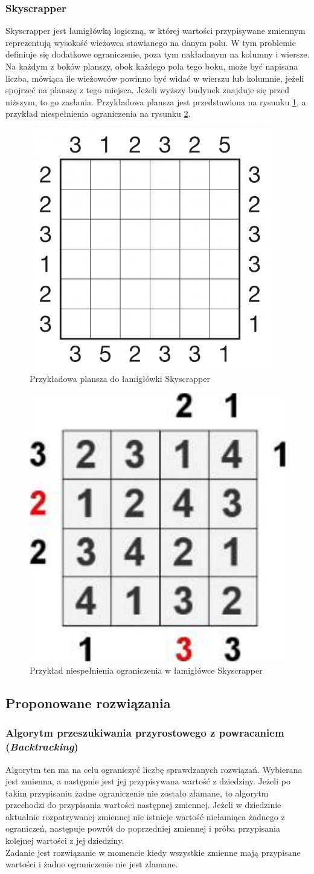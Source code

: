 \documentclass{article}
\begin{document}
	\subsubsection{Skyscrapper}
	Skyscrapper jest łamigłówką logiczną, w której wartości przypisywane zmiennym reprezentują wysokość wieżowca stawianego na danym polu. W tym problemie definiuje się dodatkowe ograniczenie, poza tym nakładanym na kolumny i wiersze. Na każdym z boków planszy, obok każdego pola tego boku, może być napisana liczba, mówiąca ile wieżowców powinno być widać w wierszu lub kolumnie, jeżeli spojrzeć na planszę z tego miejsca. Jeżeli wyższy budynek znajduje się przed niższym, to go zasłania. Przykładowa plansza jest przedstawiona na rysunku \ref{fig:skyscrapper_board}, a przykład niespełnienia ograniczenia na rysunku \ref{fig:skyscrapper_board_incorrect}.
	\begin{figure}[H]
		\centering
		\includegraphics[width=0.3\linewidth]{skyscrapper.png}
		\caption{Przykładowa plansza do łamigłówki Skyscrapper}
		\label{fig:skyscrapper_board}
	\end{figure}
	\begin{figure}[H]
		\centering
		\includegraphics[width=0.3\linewidth]{skyscrapper2.png}
		\caption{Przykład niespełnienia ograniczenia w łamigłówce Skyscrapper}
		\label{fig:skyscrapper_board_incorrect}
	\end{figure}
	\subsection{Proponowane rozwiązania}
	\subsubsection{Algorytm przeszukiwania przyrostowego z powracaniem (\textit{Backtracking})}
	Algorytm ten ma na celu ograniczyć liczbę sprawdzanych rozwiązań. Wybierana jest zmienna, a następnie jest jej przypisywana wartość z dziedziny. Jeżeli po takim przypisaniu żadne ograniczenie nie zostało złamane, to algorytm przechodzi do przypisania wartości następnej zmiennej. Jeżeli w dziedzinie aktualnie rozpatrywanej zmiennej nie istnieje wartość niełamiąca żadnego z ograniczeń, następuje powrót do poprzedniej zmiennej i próba przypisania kolejnej wartości z jej dziedziny.\\
	Zadanie jest rozwiązanie w momencie kiedy wszystkie zmienne mają przypisane wartości i żadne ograniczenie nie jest złamane.
\end{document}
